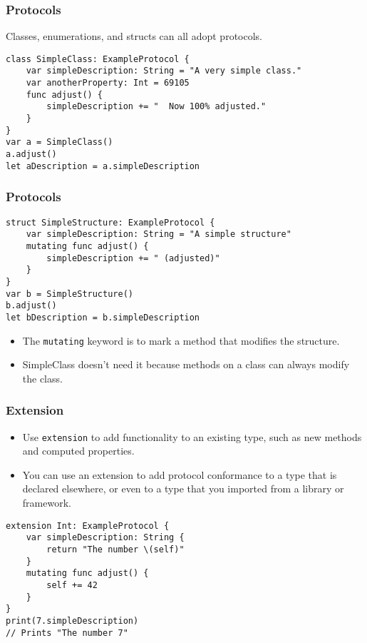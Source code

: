 \begin{frame}[fragile] \frametitle{Protocols}

Classes, enumerations, and structs can all adopt protocols.

\begin{lstlisting}
class SimpleClass: ExampleProtocol {
    var simpleDescription: String = "A very simple class."
    var anotherProperty: Int = 69105
    func adjust() {
        simpleDescription += "  Now 100% adjusted."
    }
}
var a = SimpleClass()
a.adjust()
let aDescription = a.simpleDescription
\end{lstlisting}
\end{frame}

\begin{frame}[fragile] \frametitle{Protocols}

\begin{lstlisting}
struct SimpleStructure: ExampleProtocol {
    var simpleDescription: String = "A simple structure"
    mutating func adjust() {
        simpleDescription += " (adjusted)"
    }
}
var b = SimpleStructure()
b.adjust()
let bDescription = b.simpleDescription
\end{lstlisting}

\begin{itemize}
\item The \lstinline|mutating| keyword is to mark a method that modifies the structure. 
\item SimpleClass doesn’t need it because methods on a class can always modify the class.
\end{itemize}

\end{frame}


\begin{frame}[fragile] \frametitle{Extension}

\begin{itemize}
\item Use \lstinline|extension| to add functionality to an existing type, such as new methods and computed properties. 
\item You can use an extension to add protocol conformance to a type that is declared elsewhere, or even to a type that you imported from a library or framework.
\end{itemize}

\begin{lstlisting}
extension Int: ExampleProtocol {
    var simpleDescription: String {
        return "The number \(self)"
    }
    mutating func adjust() {
        self += 42
    }
}
print(7.simpleDescription)
// Prints "The number 7"
\end{lstlisting}
\end{frame}

